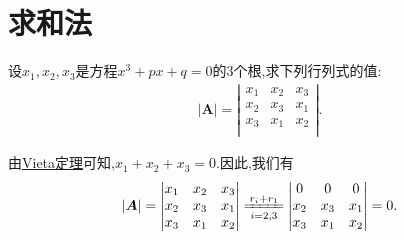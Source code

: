 \documentclass[../../main.tex]{subfiles}
\begin{document}
\section{求和法}

\begin{example}
设$x_1,x_2,x_3$是方程$x^3+px+q=0$的3个根,求下列行列式的值:
\begin{gather}
\left| \boldsymbol{A} \right|=\left| \begin{matrix}
x_1&		x_2&		x_3\\
x_2&		x_3&		x_1\\
x_3&		x_1&		x_2\\
\end{matrix} \right|.
\nonumber
\end{gather}
\end{example}
\begin{solution}
由\hyperref[theorem:Vieta定理]{Vieta定理}可知,$x_1+x_2+x_3=0$.因此,我们有
\begin{equation}
\begin{split}
\left| \boldsymbol{A} \right|=\left| \begin{matrix}
x_1&		x_2&		x_3\\
x_2&		x_3&		x_1\\
x_3&		x_1&		x_2\\
\end{matrix} \right|\xlongequal[i=2,3]{r_i+r_1}\left| \begin{matrix}
0&		0&		0\\
x_2&		x_3&		x_1\\
x_3&		x_1&		x_2\\
\end{matrix} \right|=0.
\end{split}
\nonumber
\end{equation}
\end{solution}
\end{document}
